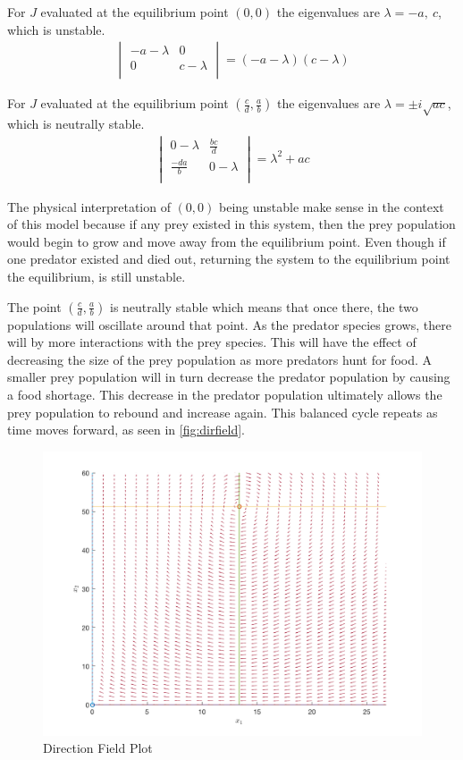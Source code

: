 \documentclass[12pt]{article}   %
\theoremstyle{definition}
\numberwithin{equation}{section}
\begin{document}
\quad For $J$ evaluated at the equilibrium point $(0,0)$ the eigenvalues are $\lambda=-a,\ c$, which is unstable.
\begin{align*}
  \begin{vmatrix}
    -a-\lambda &0\\
    0& c-\lambda\\
  \end{vmatrix}
  =(-a-\lambda)(c-\lambda)
\end{align*}

\quad For $J$ evaluated at the equilibrium point $(\frac{c}{d},\frac{a}{b})$ the eigenvalues are  $\lambda=\pm i\sqrt{ac}$, which is neutrally stable.
\begin{align*}
  \begin{vmatrix}
    0-\lambda & \frac{bc}{d}\\
    \frac{-da}{b} & 0-\lambda\\
  \end{vmatrix}
  =\lambda^2+ac
\end{align*}

\quad The physical interpretation of $(0,0)$ being unstable make sense in the context of this model because if any prey existed in this system, then the prey population would begin to grow and move away from the equilibrium point. Even though if one predator existed and died out, returning the system to the equilibrium point the equilibrium, is still unstable. 

\quad The point $(\frac{c}{d},\frac{a}{b})$ is neutrally stable which means that once there, the two populations will oscillate around that point. As the predator species grows, there will by more interactions with the prey species. This will have the effect of decreasing the size of the prey population as more predators hunt for food. A smaller prey population will in turn decrease the predator population by causing a food shortage. This decrease in the predator population ultimately allows the prey population to rebound and increase again. This balanced cycle repeats as time moves forward, as seen in \autoref{fig:dirfield}. 

\begin{figure} [h] 
  \centering
  \includegraphics[width=15cm]{images/dirfield.png}
  \caption{Direction Field Plot}
  \label{fig:dirfield}
\end{figure}
\end{document}
